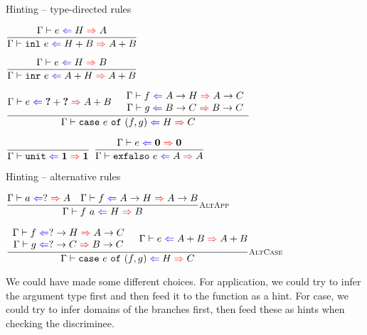 \documentclass{beamer}
\begin{document}
\begin{frame}{Hinting -- type-directed rules}

\begin{center}
  $\infrule{\hinting{e}{H}{A}}{\hinting{\inl{e}}{\Sum{H}{B}}{\Sum{A}{B}}}$

  \vspace{2em}

  $\infrule{\hinting{e}{H}{B}}{\hinting{\inr{e}}{\Sum{A}{H}}{\Sum{A}{B}}}$

  \vspace{2em}

  $\infrule{\hinting{e}{\Sum{\Hole}{\Hole}}{\Sum{A}{B}} \quad \begin{array}{c} \hinting{f}{\Fun{A}{H}}{\Fun{A}{C}} \\ \hinting{g}{\Fun{B}{C}}{\Fun{B}{C}} \end{array}}{\hinting{\case{e}{f}{g}}{H}{C}}$

  \vspace{2em}

  $\infrule{}{\hinting{\unit}{\Unit}{\Unit}}$ \quad
  $\infrule{\hinting{e}{\Empty}{\Empty}}{\hinting{\exfalso{e}}{A}{A}}$
\end{center}

\end{frame}

\begin{frame}{Hinting -- alternative rules}

\begin{center}
  $\infrule[AltApp]{\hinting{a}{?}{A} \quad \hinting{f}{\Fun{A}{H}}{\Fun{A}{B}}}{\hinting{\app{f}{a}}{H}{B}}$

  \vspace{2em}

  $\infrule[AltCase]{\begin{array}{c} \hinting{f}{\Fun{?}{H}}{\Fun{A}{C}} \\ \hinting{g}{\Fun{?}{C}}{\Fun{B}{C}} \end{array} \quad \hinting{e}{\Sum{A}{B}}{\Sum{A}{B}}}{\hinting{\case{e}{f}{g}}{H}{C}}$
\end{center}

\vspace{2em}

We could have made some different choices. For application, we could try to infer the argument type first and then feed it to the function as a hint. For case, we could try to infer domains of the branches first, then feed these as hints when checking the discriminee.

\end{frame}
\end{document}
